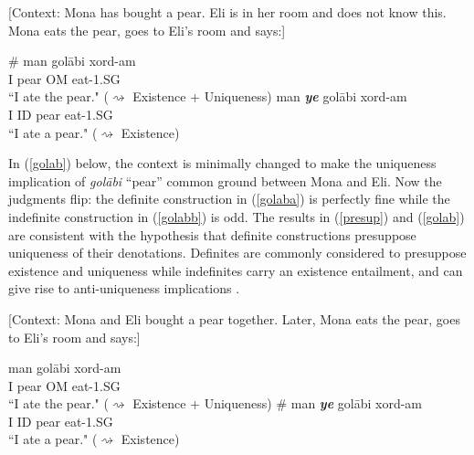 \documentclass[12pt]{article}
\begin{document}
	\begin {exe}
		\ex \label {presup}	{[Context: Mona has bought a pear. Eli is in her room and does not know this. Mona eats the pear, goes to Eli's room and says:]}\begin {xlist}
    		\ex \label{presupa}	\gll 	\#	man		gol\={a}bi  xord-am\\
    				{}	I		pear {\scriptsize OM} eat-{\scriptsize 1.SG}\\
    			\glt 	``I ate the pear." ($\rightsquigarrow$ Existence + Uniqueness)
    		\ex \label {presupb}	\gll 	man	{\color{red}\emph {\textbf {ye}}}	gol\={a}bi	xord-am\\
    				I	{\scriptsize ID}	pear	eat-{\scriptsize 1.SG}\\
    			\glt 	``I ate a pear." ($\rightsquigarrow$ Existence)
		\end {xlist}
	\end {exe}

In (\ref{golab}) below, the context is minimally changed to make the uniqueness implication of \emph{gol\={a}bi} ``pear'' common ground between Mona and Eli. Now the judgments flip: the definite construction in (\ref{golaba}) is perfectly fine while the indefinite construction in (\ref{golabb}) is odd. The results in (\ref{presup}) and (\ref{golab}) are consistent with the hypothesis that definite constructions presuppose uniqueness of their denotations. Definites are commonly considered to presuppose existence and uniqueness while indefinites carry an existence entailment, and can give rise to anti-uniqueness implications \citep{coppock2012weak, heim1991artikel}.

	\begin {exe}
		\ex \label{golab} {[Context: Mona and Eli bought a pear together. Later, Mona eats the pear, goes to Eli's room and says:]}\begin {xlist}
    		\ex \label{golabb}	\gll 	man		gol\={a}bi \fbox{ro} xord-am\\
    				I		pear {\scriptsize OM} eat-{\scriptsize 1.SG}\\
    			\glt 	``I ate the pear." ($\rightsquigarrow$ Existence + Uniqueness)
    		\ex \label {golaba}	\gll \# 	man	{\color{red}\emph {\textbf {ye}}}	gol\={a}bi	xord-am\\
    				{}	I	{\scriptsize ID}	pear	eat-{\scriptsize 1.SG}\\
    			\glt 	``I ate a pear." ($\rightsquigarrow$ Existence)
		\end {xlist}
	\end {exe}
\end{document}
